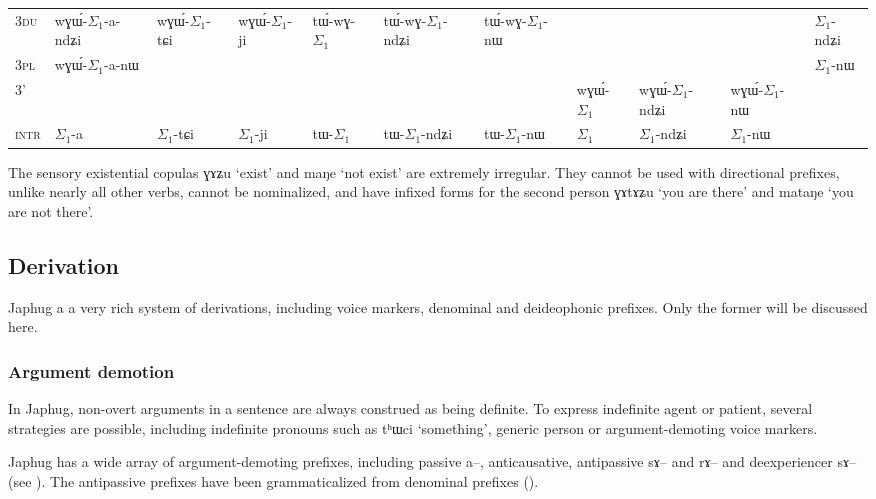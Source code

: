 \documentclass[oldfontcommands,oneside,a4paper,11pt]{article}
\newcommand{\ipa}[1]{{\phon#1}} %
\newcommand{\grise}[1]{\cellcolor{lightgray}\textbf{#1}}
\newcommand{\siga}{$\Sigma_1$}
\begin{document}
\begin{table}[H]
{\begin{tabular}{l|l|l|l|l|l|l|l|l|l|l|}
\cline{2-2}
\cline{11-11}
\textsc{3du} &  	\ipa{wɣɯ́-\siga{}-a-ndʑi} & 	 \ipa{wɣɯ́-\siga{}-tɕi} & 		\ipa{wɣɯ́-\siga{}-ji} & 	\ipa{tɯ́-wɣ-\siga{}} & 	\ipa{tɯ́-wɣ-\siga{}-ndʑi} & 	\ipa{tɯ́-wɣ-\siga{}-nɯ} & 	\multicolumn{3}{c|}{\grise{}} &	\ipa{\siga{}-ndʑi} \\ 
\cline{2-2}	
\cline{11-11}
\textsc{3pl} &  	\ipa{wɣɯ́-\siga{}-a-nɯ} & 	\ipa{} & 	\ipa{} & 	\ipa{} & 	\ipa{} & 	\ipa{} & \multicolumn{3}{c|}{\grise{}} &	\ipa{\siga{}-nɯ} \\ 	
\hline
\textsc{3'} & 	\multicolumn{6}{c|}{\grise{}} &	\ipa{wɣɯ́-\siga{}} & 	\ipa{wɣɯ́-\siga{}-ndʑi} & 	\ipa{wɣɯ́-\siga{}-nɯ} & 	\grise{} \\	
	\hline	\hline
\textsc{intr}&\ipa{\siga{}-a}&\ipa{\siga{}-tɕi}&\ipa{\siga{}-ji}&\ipa{tɯ-\siga{}}&\ipa{tɯ-\siga{}-ndʑi}&\ipa{tɯ-\siga{}-nɯ}&\ipa{\siga{}}&\ipa{\siga{}-ndʑi} &\ipa{\siga{}-nɯ}& 	\grise{} \\	
	\hline
\end{tabular}}
\end{table}

The sensory existential copulas \ipa{ɣɤʑu} `exist' and \ipa{maŋe} `not exist' are extremely irregular. They cannot be used with directional prefixes, unlike nearly all other verbs, cannot be nominalized, and have infixed forms for the second person \ipa{ɣɤtɤʑu} `you are there' and \ipa{mataŋe} `you are not there'.

\subsection{Derivation}
Japhug a a very rich system of derivations, including voice markers, denominal and deideophonic prefixes. Only the former will be discussed here.

\subsubsection{Argument demotion}
In Japhug, non-overt arguments in a sentence are always construed as being definite. To express indefinite agent or patient, several strategies are possible, including indefinite pronouns such as \ipa{tʰɯci} `something', generic person or argument-demoting voice markers.

Japhug has a wide array of argument-demoting prefixes, including passive \ipa{a--}, anticausative, antipassive \ipa{sɤ--} and \ipa{rɤ--} and deexperiencer \ipa{sɤ--} (see \citealt{jacques12demotion}). The antipassive prefixes have been grammaticalized from denominal prefixes (\citealt{jacques14antipassive}).
\end{document}
